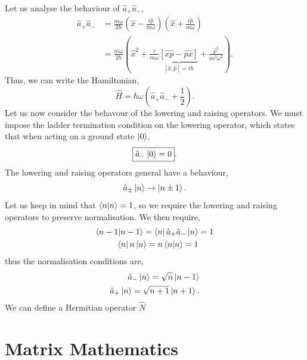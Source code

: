 \documentclass{book}
\begin{document}
Let us analyse the behaviour of $\hat{a}_+\hat{a}_-$,
\begin{equation}
	\begin{split}
		\hat{a}_+\hat{a}_- & = \frac{m\omega}{2\hbar} \left(\hat{x} - \frac{i\hat{p}}{m\omega}\right)\left(\hat{x} + \frac{i\hat{p}}{m\omega}\right) \\
		& = \frac{m\omega}{2\hbar} \left(\hat{x}^2 + \frac{i}{m\omega}\underbrace{\left[\hat{x}\hat{p} - \hat{p}\hat{x}\right]}_{\left[\hat{x},\hat{p}\right] = i\hbar} +\frac{\hat{p}^2}{m^2 \omega^2}\right).
	\end{split}
\end{equation}
Thus, we can write the Hamiltonian,
\begin{equation}
	\hat{H} = \hbar \omega \left(\hat{a}_+\hat{a}_- + \frac{1}{2}\right).
\end{equation}
Let us now consider the behavour of the lowering and raising operators. We must impose the ladder termination condition on the lowering operator, which states that when acting on a ground state $\ket{0}$,
\begin{equation}
	\boxed{\hat{a}_- \ket{0} = 0}.
\end{equation}
The lowering and raising operators general have a behaviour,
\begin{equation}
	\hat{a}_{\pm}\ket{n} \to \ket{n \pm 1}.
\end{equation}
Let us keep in mind that $\braket{n}{n} = 1$, so we require the lowering and raising operators to preserve normalisation. We then require,
\begin{equation}
	\begin{split}
		\braket{n-1}{n-1} = \bra{n}\hat{a}_+\hat{a}_-\ket{n} & = 1 \\
		\bra{n}n\ket{n} = n\braket{n}{n} = 1
	\end{split}
\end{equation}
thus the normalisation conditions are,
\begin{align}	
	\hat{a}_-\ket{n} = \sqrt{n}\ket{n-1} \\
	\hat{a}_+\ket{n} = \sqrt{n+1}\ket{n+1}.
\end{align}
We can define a Hermitian operator $\hat{N}$ 
\appendix
\chapter {Matrix Mathematics}
\end{document}
